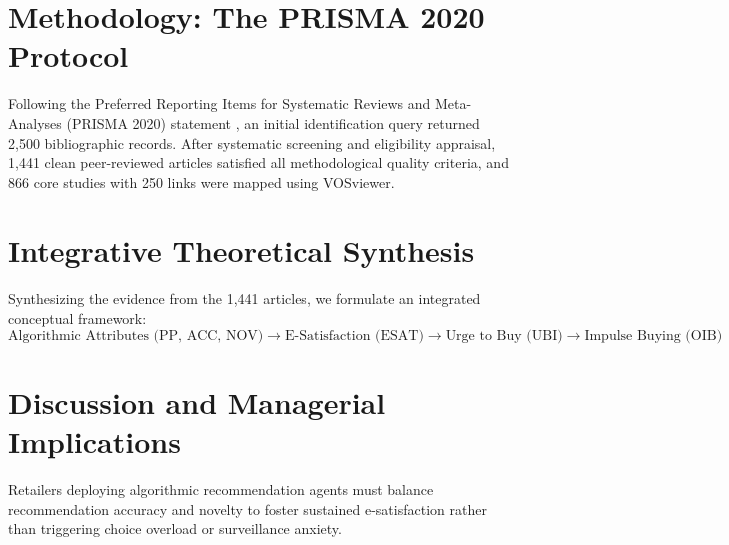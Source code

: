 \documentclass[preprint,12pt,authoryear]{elsarticle}
\begin{document}
\section{Methodology: The PRISMA 2020 Protocol}
Following the Preferred Reporting Items for Systematic Reviews and Meta-Analyses (PRISMA 2020) statement \citep{page2021prisma}, an initial identification query returned 2,500 bibliographic records. After systematic screening and eligibility appraisal, 1,441 clean peer-reviewed articles satisfied all methodological quality criteria, and 866 core studies with 250 links were mapped using VOSviewer.

\section{Integrative Theoretical Synthesis}
Synthesizing the evidence from the 1,441 articles, we formulate an integrated conceptual framework:
\begin{equation}
\text{Algorithmic Attributes (PP, ACC, NOV)} \longrightarrow \text{E-Satisfaction (ESAT)} \longrightarrow \text{Urge to Buy (UBI)} \longrightarrow \text{Impulse Buying (OIB)}
\end{equation}

\section{Discussion and Managerial Implications}
Retailers deploying algorithmic recommendation agents must balance recommendation accuracy and novelty to foster sustained e-satisfaction rather than triggering choice overload or surveillance anxiety.



\end{document}
